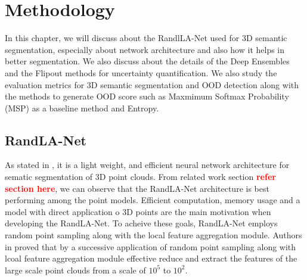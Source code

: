 
\chapter{Methodology}
In this chapter, we will discuss about the RandlLA-Net used for 3D semantic segmentation, especially about network architecture and also how it helps in better segmentation.
We also discuss about the details of the Deep Ensembles and the Flipout methods for uncertainty quantification.
We also study the evaluation metrics for 3D semantic segmentation and OOD detection along with the methods to generate OOD score such as Maxmimum Softmax Probability (MSP) as a baseline method and Entropy.
\section{RandLA-Net}
As stated in \cite{Hu_2020_CVPR_Randla}, it is a light weight, and efficient neural network architecture for sematic segmentation of 3D point clouds.
From related work section \textcolor{red}{\textbf{refer section here}}, we can observe that the RandLA-Net architecture is best performing among the point models.
Efficient computation, memory usage and a model with direct application o 3D points are the main motivation when developing the RandLA-Net.
To acheive these goals, RandLA-Net employs random point sampling along with the local feature aggregation module.
Authors in \cite{Hu_2020_CVPR_Randla} proved that by a successive application of random point sampling along with lcoal feature aggregation module effective reduce and extract the features of the large scale point clouds from a scale of $10^5$ to $10^2$.

